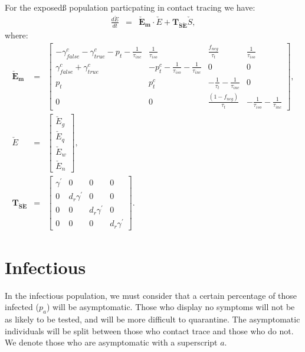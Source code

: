 \documentclass[notitlepage, superscriptaddress]{revtex4-2}
\begin{document}
For the exposedß population particpating in contact tracing we have:
\begin{eqnarray}
\frac{d\check{E}}{dt} &=& \boldsymbol{\check{E}_{m}} \cdot \check{E} + \boldsymbol{T_{\check{S}\check{E}}}  \check{S}, 
\end{eqnarray}
where:
\begin{eqnarray}
\boldsymbol{\check{E}_{m}} &=&
\begin{bmatrix}
 -\gamma^{c}_{false} -\gamma^{c}_{true} - p_{t} -\frac{1}{\tau_{inc}} & \frac{1}{\tau_{iso}}  & \frac{f_{neg}}{\tau_{t}} & \frac{1}{\tau_{iso}} \\
\gamma^{c}_{false} + \gamma^{c}_{true}    &  -p^{c}_{t}  - \frac{1}{\tau_{iso}} - \frac{1}{\tau_{inc}}      &  0    & 0  \\
p_{t}     &  p^{c}_{t}                  &  -\frac{1}{\tau_{t}}  - \frac{1}{\tau_{inc}}  & 0 \\
0 & 0 & \frac{(1-f_{neg})}{\tau_{t}}  & -\frac{1}{\tau_{iso}}  -  \frac{1}{\tau_{inc}} 
\end{bmatrix}, \\ 
%
\check{E} &=& 
\begin{bmatrix}
\check{E}_{g} \\ \check{E}_{q} \\ \check{E}_{w}\\ \check{E}_{n}
\end{bmatrix}, \\ 
%
\boldsymbol{T_{\check{S}\check{E}}} &=&
\begin{bmatrix}
\gamma^{'}  & 0                 & 0                 & 0 \\ 
 0          & d_{r} \gamma^{'}  & 0                 & 0 \\ 
 0          & 0                 & d_{r} \gamma^{'}  & 0  \\
 0          & 0                 & 0                 & d_{r} \gamma^{'}
\end{bmatrix}.
\end{eqnarray}


\section{Infectious}
In the infectious population, we must consider that a certain percentage of those infected ($p_{a}$) will be asymptomatic. Those who display no symptoms will not be as likely to be tested, and will be more difficult to quarantine. The asymptomatic individuals will be split between those who contact trace and those who do not. We denote those who are asymptomatic with a superscript $a$. 
\end{document}
